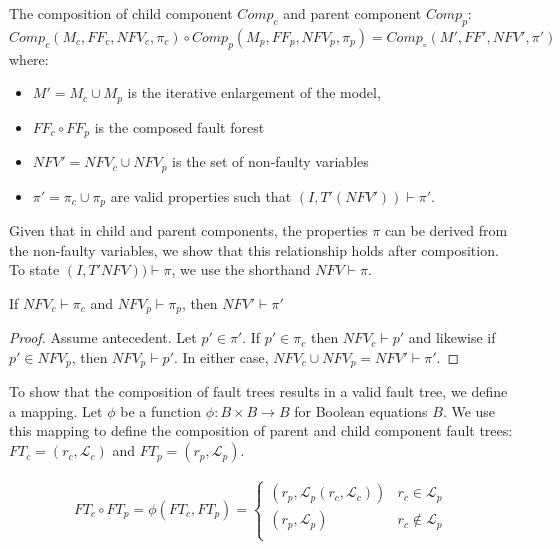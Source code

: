 \begin{definition}
The composition of child component $\mathit{Comp}_c$ and parent component $\mathit{Comp}_p$:
$Comp_c(M_c, \mathit{FF}_c, \mathit{NFV}_c, \pi_c) \circ Comp_p(M_p, \mathit{FF}_p, \mathit{NFV}_p, \pi_p) = Comp_\circ(M', \mathit{FF}', \mathit{NFV}', \pi')$ where:
\begin{itemize}[label=\textbullet]
\item $M' = M_c \cup M_p$ is the iterative enlargement of the model,
\item $\mathit{FF}_c \circ \mathit{FF}_p$ is the composed fault forest
\item $\mathit{NFV}' = \mathit{NFV}_c \cup \mathit{NFV}_p$ is the set of non-faulty variables
\item $\pi' = \pi_c \cup \pi_p$ are valid properties such that $(I, T'(\mathit{NFV}')) \vdash \pi'$.
\end{itemize}
\end{definition}


Given that in child and parent components, the properties $\pi$ can be derived from the non-faulty variables, we show that this relationship holds after composition. To state $(I, T'\mathit{NFV})) \vdash \pi$, we use the shorthand $\mathit{NFV} \vdash \pi$. 

\begin{theorem} If $\mathit{NFV}_c \vdash \pi_c$ and $\mathit{NFV}_p \vdash \pi_p$, then $\mathit{NFV}' \vdash \pi'$
\begin{proof}
Assume antecedent. Let $p' \in \pi'$. If $p' \in \pi_c$ then $\mathit{NFV}_c \vdash p'$ and likewise if $p' \in \mathit{NFV}_p$, then $\mathit{NFV}_p \vdash p'$. In either case, $\mathit{NFV}_c \cup \mathit{NFV}_p = \mathit{NFV}' \vdash \pi'$.
\end{proof}
\end{theorem} 

To show that the composition of fault trees results in a valid fault tree, we define a mapping. Let $\phi$ be a function $\phi : B \times B \rightarrow B$ for Boolean equations $B$. We use this mapping to define the composition of parent and child component fault trees: $\mathit{FT}_c = (r_c, \mathcal{L}_c)$ and $\mathit{FT}_p = (r_p, \mathcal{L}_p)$.

\begin{gather}
\mathit{FT}_c \circ \mathit{FT}_p = \phi(\mathit{FT}_c, \mathit{FT}_p) =\begin{cases} 
      (r_p, \mathcal{L}_p(r_c, \mathcal{L}_c)) & r_c \in \mathcal{L}_p \\
      (r_p, \mathcal{L}_p) & r_c \not\in \mathcal{L}_p \\
   \end{cases}
\label{eq:phi}
\end{gather}

